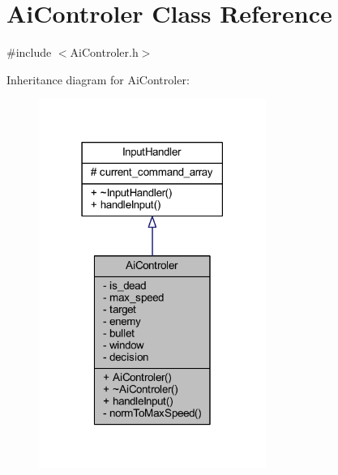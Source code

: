\hypertarget{class_ai_controler}{}\section{Ai\+Controler Class Reference}
\label{class_ai_controler}


{\ttfamily \#include $<$Ai\+Controler.\+h$>$}



Inheritance diagram for Ai\+Controler\+:\nopagebreak
\begin{figure}[H]
\begin{center}
\leavevmode
\includegraphics[width=210pt]{class_ai_controler__inherit__graph}
\end{center}
\end{figure}


